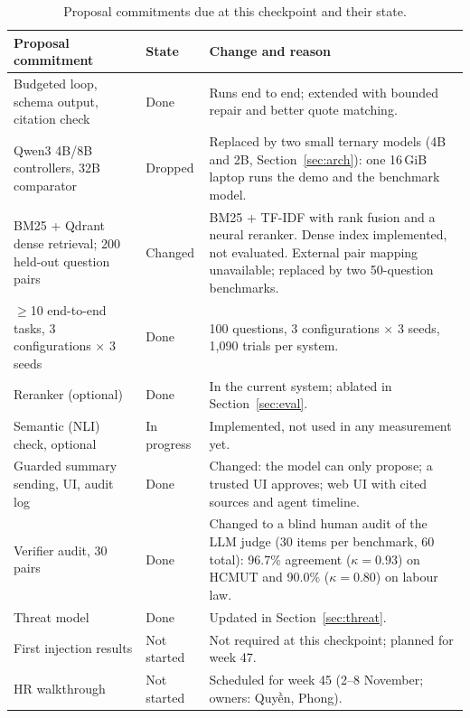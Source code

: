 \begin{table}[!htbp]\tabstyle
\begin{tabularx}{\textwidth}{@{}L{4.2cm}L{1.6cm}Y@{}}
\toprule Proposal commitment & State & Change and reason\\\midrule
Budgeted loop, schema output, citation check & Done & Runs end to end; extended with bounded repair and better quote matching.\\
Qwen3 4B/8B controllers, 32B comparator & Dropped & Replaced by two small ternary models (4B and 2B, Section~\ref{sec:arch}): one 16\,GiB laptop runs the demo and the benchmark model.\\
BM25 + Qdrant dense retrieval; 200 held-out question pairs & Changed & BM25 + TF-IDF with rank fusion and a neural reranker. Dense index implemented, not evaluated. External pair mapping unavailable; replaced by two 50-question benchmarks.\\
$\ge$10 end-to-end tasks, 3 configurations $\times$ 3 seeds & Done & 100 questions, 3 configurations $\times$ 3 seeds, 1{,}090 trials per system.\\
Reranker (optional) & Done & In the current system; ablated in Section~\ref{sec:eval}.\\
Semantic (NLI) check, optional & In progress & Implemented, not used in any measurement yet.\\
Guarded summary sending, UI, audit log & Done & Changed: the model can only propose; a trusted UI approves; web UI with cited sources and agent timeline.\\
Verifier audit, 30 pairs & Done & Changed to a blind human audit of the LLM judge (30 items per benchmark, 60 total): 96.7\% agreement ($\kappa=0.93$) on HCMUT and 90.0\% ($\kappa=0.80$) on labour law.\\
Threat model & Done & Updated in Section~\ref{sec:threat}.\\
First injection results & Not started & Not required at this checkpoint; planned for week 47.\\
HR walkthrough & Not started & Scheduled for week 45 (2--8 November; owners: Quyền, Phong).\\
\bottomrule\end{tabularx}
\caption{Proposal commitments due at this checkpoint and their state.}\label{tab:commit}
\end{table}
